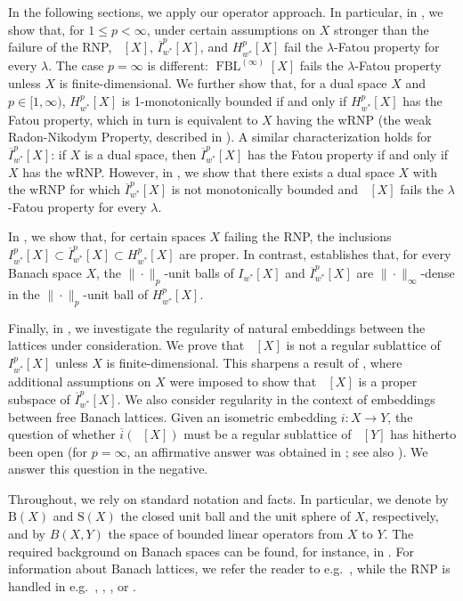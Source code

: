 \documentclass{amsart}
\theoremstyle{plain}
\theoremstyle{definition}
\numberwithin{equation}{section}
\newcommand{\ball}{\mathrm{B}}
\newcommand{\sphere}{\textrm{S}}
\DeclareMathOperator{\FBL}{FBL}
\DeclareMathOperator{\FBLp}{FBL^{\mathit{(p)}}}
\newcommand{\Hp}{H_{w^*}^{p}}
\newcommand{\nip}{I_{w^*}^{p}}
\newcommand{\Ip}{\overline{I}_{w^*}^{p}}
\begin{document}
In the following sections, we apply our operator approach. In particular, in , we show that, for $1 \leq p < \infty$, under certain assumptions on $X$ stronger than the failure of the RNP, $\FBLp[X]$, $\Ip[X]$, and $\Hp[X]$ fail the $\lambda$-Fatou property for every $\lambda$.  The case $p=\infty$ is different: $\FBL^{(\infty)}[X]$ fails the $\lambda$-Fatou property unless $X$ is finite-dimensional. We further show that, for a dual space $X$ and $p \in [1,\infty)$, $\Hp[X]$ is 1-monotonically bounded if and only if $\Hp[X]$ has the Fatou property, which in turn is equivalent to $X$ having the wRNP (the weak Radon-Nikodym Property, described in \cite[Section 7.4]{Bour}). A similar characterization holds for $\Ip[X]$: if $X$ is a dual space, then $\Ip[X]$ has the Fatou property if and only if $X$ has the wRNP. However, in , we show that there exists a dual space $X$ with the wRNP for which $\Ip[X]$ is not monotonically bounded and $\FBLp[X]$ fails the $\lambda$-Fatou property for every $\lambda$.

In , we show that, for certain spaces $X$ failing the RNP, the inclusions $\nip[X] \subset \Ip[X] \subset \Hp[X]$ are proper. In contrast,  establishes that, for every Banach space $X$, the $\|\cdot\|_p$-unit balls of $I_{w^*}[X]$ and $\Ip[X]$ are $\|\cdot\|_{\infty}$-dense in the $\|\cdot\|_p$-unit ball of $\Hp[X]$. 

Finally, in , we investigate the regularity of natural embeddings between the lattices under consideration. We prove that $\FBLp[X]$ is not a regular sublattice of $\nip[X]$ unless $X$ is finite-dimensional. This sharpens a result of \cite{LaTr}, where additional assumptions on $X$ were imposed to show that $\FBLp[X]$ is a proper subspace of $\Ip[X]$. We also consider regularity in the context of embeddings between free Banach lattices. Given an isometric embedding $i : X \to Y$,  the question of whether $\overline{i}(\FBLp[X])$ must be a regular sublattice of $\FBLp[Y]$ has hitherto been open (for $p=\infty$, an affirmative answer was obtained in \cite{AD}; see also \cite{OiTTT-cor}). We answer this question in the negative.

Throughout, we rely on standard notation and facts. In particular, we denote by $\ball(X)$ and $\sphere(X)$ the closed unit ball and the unit sphere of $X$, respectively, and by $B(X, Y)$ the space of bounded linear operators from $X$ to $Y$. The required background on Banach spaces can be found, for instance, in \cite{AK}. For information about Banach lattices, we refer the reader to e.g.~\cite{M-N}, while the RNP is handled in e.g.~\cite{Bour}, \cite{DU}, \cite{DU-survey}, or \cite[Chapter 5]{BL}. %
\end{document}
